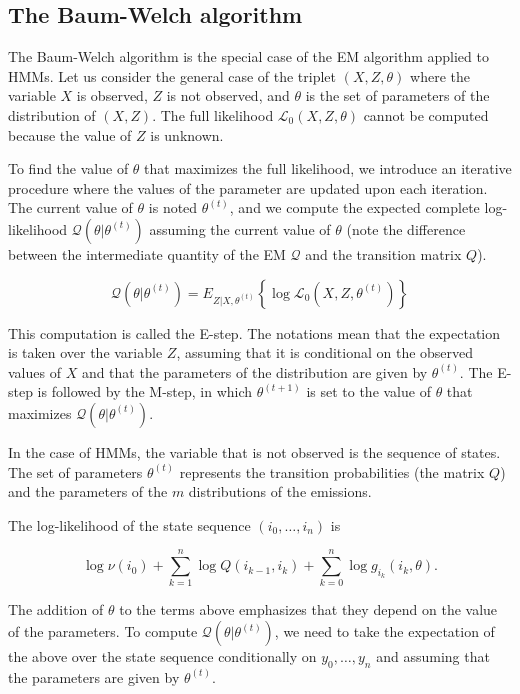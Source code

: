 \documentclass[12pt]{article}
\begin{document}
\begin{appendices}
\subsection{The Baum-Welch algorithm}
\label{sec:Baum-Welch}

    The Baum-Welch algorithm is the special case of the EM algorithm
    applied to HMMs. Let us consider the general case of the triplet
    $(X, Z, \theta)$ where the variable $X$ is observed, $Z$ is not
    observed, and $\theta$ is the set of parameters of the distribution
    of $(X,Z)$. The full likelihood $\mathcal{L}_0(X, Z, \theta)$
    cannot be computed because the value of $Z$ is unknown.

    To find the value of $\theta$ that maximizes the full likelihood,
    we introduce an iterative procedure where the values of the
    parameter are updated upon each iteration. The current value of
    $\theta$ is noted $\theta^{(t)}$, and we compute the expected
    complete log-likelihood $\mathcal{Q}(\theta|\theta^{(t)})$
    assuming the current value of $\theta$ (note the difference
    between the intermediate quantity of the EM $\mathcal{Q}$ and
    the transition matrix $Q$).

    $$ \mathcal{Q}(\theta|\theta^{(t)}) =
      E_{Z|X, \theta^{(t)}} \left\{
      \log \mathcal{L}_0(X, Z, \theta^{(t)}) \right\}$$

    This computation is called the E-step. The notations mean that
    the expectation is taken over the variable $Z$, assuming that
    it is conditional on the observed values of $X$ and that the
    parameters of the distribution are given by $\theta^{(t)}$.
    The E-step is followed by the
    M-step, in which $\theta^{(t+1)}$ is set to the value of
    $\theta$ that maximizes $\mathcal{Q}(\theta|\theta^{(t)})$.

    In the case of HMMs, the variable that is not observed is the
    sequence of states. The set of parameters $\theta^{(t)}$
    represents the transition probabilities (the matrix $Q$)
    and the parameters of the $m$ distributions of the emissions.

    The log-likelihood of the state sequence $(i_0, \ldots, i_n)$
    is

    $$ \log \nu(i_0) + \sum_{k=1}^n \log Q(i_{k-1}, i_k)
      + \sum_{k=0}^n \log g_{i_k}(i_k, \theta). $$

    The addition of $\theta$ to the terms above emphasizes that they
    depend on the value of the parameters. To compute
    $\mathcal{Q}(\theta|\theta^{(t)})$, we need to take the
    expectation of the above over the state sequence
    conditionally on $y_0, \ldots, y_n$ and assuming that the parameters
    are given by $\theta^{(t)}$.


\end{appendices}
\end{document}
